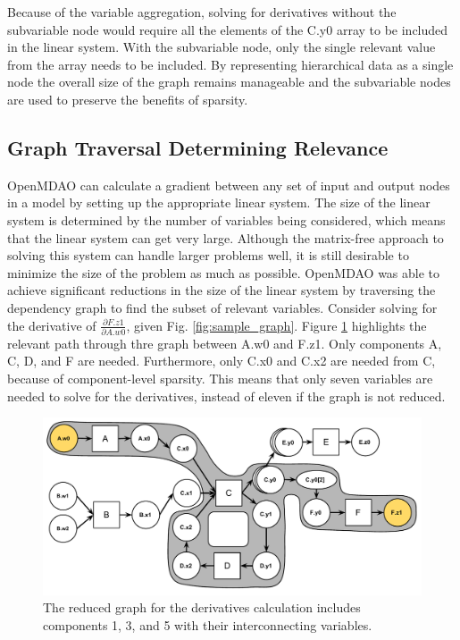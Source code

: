 \documentclass[]{aiaa-tc} %
\begin{document}
    Because of the variable aggregation, solving for derivatives without the subvariable node would require
    all the elements of the C.y0 array to be included in the linear system.
    With the subvariable node, only the single relevant value from the array needs to be included.
    By representing hierarchical data as a single node the overall size of the graph
    remains manageable and the subvariable nodes are used to preserve the benefits of sparsity.


    \subsection{Graph Traversal Determining Relevance}
    \label{sec:determing relevance}

        OpenMDAO can calculate a gradient between any set of input and output nodes in a
        model by setting up the appropriate linear system. The size of the linear system
        is determined by the number of variables being considered, which means that the linear
        system can get very large. Although the matrix-free approach to solving this system
        can handle larger problems well, it is still desirable to minimize the size of the problem
        as much as possible. OpenMDAO was able to achieve significant reductions in the
        size of the linear system by traversing the dependency graph to find the subset of relevant variables.
        Consider solving for the derivative of $\frac{\partial F.z1}{\partial A.w0}$, given Fig. \ref{fig:sample_graph}. 
        Figure \ref{fig:graph_relevance_path} highlights the relevant path through thre graph between A.w0 and F.z1. 
        Only components A, C, D, and F are needed. Furthermore, only C.x0 and C.x2 are needed from C, because of component-level sparsity.
        This means that only seven variables are needed to solve for the derivatives,
        instead of eleven if the graph is not reduced.

        \begin{figure}[!htb]\begin{center}
          \includegraphics[width=.8\textwidth]{images/sample_graph_path}
          \caption{ The reduced graph for the derivatives calculation includes components 1, 3,
          and 5 with their interconnecting variables. \label{fig:graph_relevance_path}}
        \end{center}\end{figure}
\end{document}
